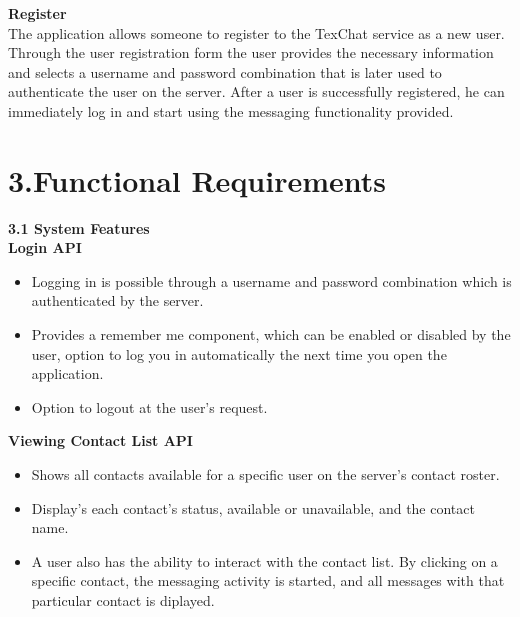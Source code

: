 \documentclass[29pt,a4paper]{moderncv}
\begin{document}
		\noindent\textbf{Register}
		\\The application allows someone to register to the TexChat service as a new user. Through the user registration form the user provides the necessary information and selects a username and password combination that is later used to authenticate the user on the server. After a user is successfully registered, he can immediately log in and start using the messaging functionality provided.
		
	\vspace{5mm}
	
\newpage	
	\section*{\textbf{3.Functional Requirements}}
	\vspace{4mm}
	\noindent \textbf{3.1 System Features}\\
	
		\noindent \textbf{Login API}
		\begin{itemize}
			\item Logging in is possible through a username and password combination which is authenticated by the server.
			\item Provides a remember me component, which can be enabled or disabled by the user, option to log you in automatically the next time you open the application.
			\item Option to logout at the user’s request.
			\\
		\end{itemize}
		
		\noindent \textbf{Viewing Contact List API}
			\begin{itemize}
				\item Shows all contacts available for a specific user on the server’s contact roster.
				\item Display’s each contact’s status, available or unavailable, and the contact name.
				\item A user also has the ability to interact with the contact list.  By clicking on a specific contact, the messaging activity is started, and all messages with that particular contact is diplayed.\\
			\end{itemize}
		
\end{document}
